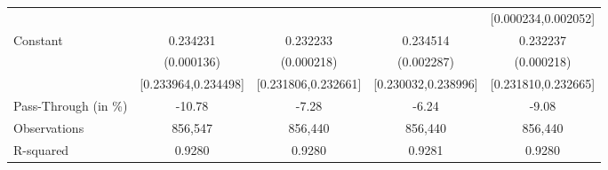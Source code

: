 {\begin{tabular}{l*{4}{c}}
                    &                     &                     &                     &[0.000234,0.002052]         \\
Constant            &    0.234231\sym{***}&    0.232233\sym{***}&    0.234514\sym{***}&    0.232237\sym{***}\\
                    &  (0.000136)         &  (0.000218)         &  (0.002287)         &  (0.000218)         \\
                    &[0.233964,0.234498]         &[0.231806,0.232661]         &[0.230032,0.238996]         &[0.231810,0.232665]         \\
\midrule
Pass-Through (in \%)&      -10.78         &       -7.28         &       -6.24         &       -9.08         \\
Observations        &     856,547         &     856,440         &     856,440         &     856,440         \\
R-squared           &      0.9280         &      0.9280         &      0.9281         &      0.9280         \\
\bottomrule
\end{tabular}
}
